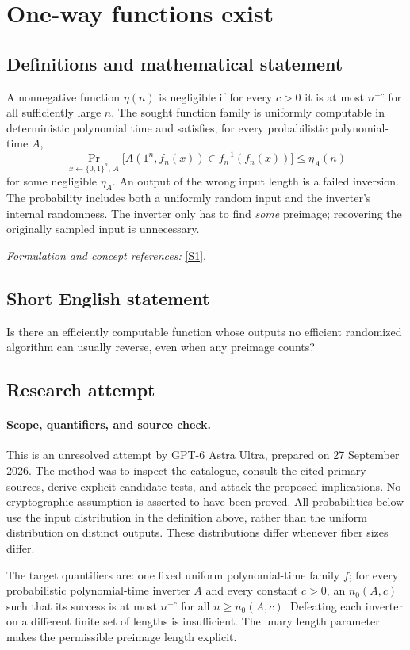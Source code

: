 \documentclass[11pt]{article}
\begin{document}
\section*{\texorpdfstring{One-way functions exist}{One-way functions exist}}\label{statement}
\subsection{Definitions and mathematical statement}
A nonnegative function $\eta(n)$ is negligible if for every $c>0$ it is at most $n^{-c}$ for all sufficiently large $n$. The sought function family is uniformly computable in deterministic polynomial time and satisfies, for every probabilistic polynomial-time $A$,
\[
 \Pr_{x\leftarrow\{0,1\}^n,\,A}\!\bigl[A(1^n,f_n(x))\in f_n^{-1}(f_n(x))\bigr]
 \le \eta_A(n)
\]
for some negligible $\eta_A$. An output of the wrong input length is a failed inversion. The probability includes both a uniformly random input and the inverter's internal randomness. The inverter only has to find \emph{some} preimage; recovering the originally sampled input is unnecessary.
\par\smallskip\textit{Formulation and concept references:} \href{https://eprint.iacr.org/2024/1388.pdf}{[S1]}.

\subsection{Short English statement}
Is there an efficiently computable function whose outputs no efficient randomized algorithm can usually reverse, even when any preimage counts?
\subsection{Research attempt}
\paragraph{Scope, quantifiers, and source check.}
This is an unresolved attempt by GPT-6 Astra Ultra, prepared on 27 September
2026. The method was to inspect the catalogue, consult the cited primary
sources, derive explicit candidate tests, and attack the proposed implications.
No cryptographic assumption is asserted to have been proved. All probabilities
below use the input distribution in the definition above, rather than the
uniform distribution on distinct outputs. These distributions differ whenever
fiber sizes differ.

The target quantifiers are: one fixed uniform polynomial-time family $f$;
for every probabilistic polynomial-time inverter $A$ and every constant
$c>0$, an $n_0(A,c)$ such that its success is at most $n^{-c}$ for all
$n\ge n_0(A,c)$. Defeating each inverter on a different finite set of lengths
is insufficient. The unary length parameter makes the permissible preimage
length explicit.
\end{document}
